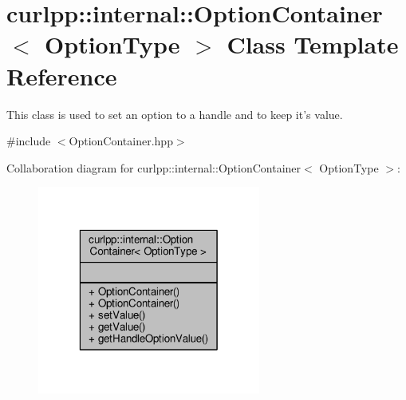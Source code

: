 \hypertarget{classcurlpp_1_1internal_1_1OptionContainer}{\section{curlpp\-:\-:internal\-:\-:Option\-Container$<$ Option\-Type $>$ Class Template Reference}
\label{classcurlpp_1_1internal_1_1OptionContainer}
}


This class is used to set an option to a handle and to keep it's value.  




{\ttfamily \#include $<$Option\-Container.\-hpp$>$}



Collaboration diagram for curlpp\-:\-:internal\-:\-:Option\-Container$<$ Option\-Type $>$\-:
\nopagebreak
\begin{figure}[H]
\begin{center}
\leavevmode
\includegraphics[width=208pt]{classcurlpp_1_1internal_1_1OptionContainer__coll__graph}
\end{center}
\end{figure}
